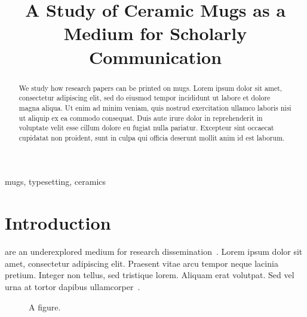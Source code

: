 \documentclass[conference]{IEEEtran}
\begin{document}
\title{A Study of Ceramic Mugs as a Medium for Scholarly Communication}

\author{
\and
{}
}

\maketitle

\begin{abstract}
We study how research papers can be printed on mugs. %
Lorem ipsum dolor sit amet, consectetur adipiscing elit, sed do eiusmod tempor incididunt ut labore et dolore magna aliqua. Ut enim ad minim veniam, quis nostrud exercitation ullamco laboris nisi ut aliquip ex ea commodo consequat. Duis aute irure dolor in reprehenderit in voluptate velit esse cillum dolore eu fugiat nulla pariatur. Excepteur sint occaecat cupidatat non proident, sunt in culpa qui officia deserunt mollit anim id est laborum.
\end{abstract}

\begin{IEEEkeywords}
mugs, typesetting, ceramics
\end{IEEEkeywords}

\section{Introduction}
 are an underexplored medium for research dissemination~\cite{smith2020,doe2021}.
Lorem ipsum dolor sit amet, consectetur adipiscing elit. Praesent vitae arcu tempor neque lacinia pretium. Integer non tellus, sed tristique lorem. Aliquam erat volutpat. Sed vel urna at tortor dapibus ullamcorper~\cite{doe2021}.

\begin{figure}[t]
\centering
{}
\caption{A figure.}
\end{figure}
\end{document}
